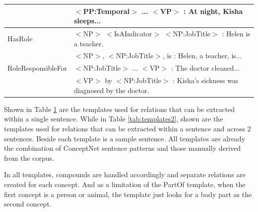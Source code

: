 \begin{table}[H]
\begin{tabular}{|p{3.5cm}|p{10cm}|}
					& $<$PP:Temporal$>$ ... $<$VP$>$ : At night, Kisha sleeps... \\ \hline
HasRole				& $<$NP$>$ $<$IsAIndicator$>$ $<$NP:JobTitle$>$ : Helen is a teacher. \\
					& $<$NP$>$, $<$NP:JobTitle$>$, is : Helen, a teacher, is... \\ \hline
RoleResponsibleFor	& $<$NP:JobTitle$>$ ... $<$VP$>$ : The doctor cleaned... \\
					& $<$VP$>$ by $<$NP:JobTitle$>$ : Kisha's sickness was diagnosed by the doctor. \\ \hline
\end{tabular}
\label{tab:templates1}
\end{table}

Shown in Table \ref{tab:templates1} are the templates used for relations that can be extracted within a single sentence. While in Table \ref{tab:templates2}, shown are the templates used for relations that can be extracted within a sentence and across 2 sentences. Beside each template is a sample sentence. All templates are already the combination of ConceptNet sentence patterns and those manually derived from the corpus.

In all templates, compounds are handled accordingly and separate relations are created for each concept. And as a limitation of the PartOf template, when the first concept is a person or animal, the template just looks for a body part as the second concept. 

